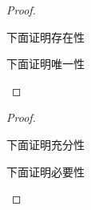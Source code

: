 \documentclass{xdyy-usermanual}
\begin{document}
\begin{vexample}
    \begin{proof}
      \begin{existence}
        下面证明存在性
      \end{existence}
      \begin{uniqueness}
        下面证明唯一性
      \end{uniqueness}
    \end{proof}
\end{vexample}

\begin{vexample}
    \begin{proof}
      \begin{sufficiency}
        下面证明充分性
      \end{sufficiency}
      \begin{necessity}
        下面证明必要性
      \end{necessity}
    \end{proof}
\end{vexample}
\end{document}
